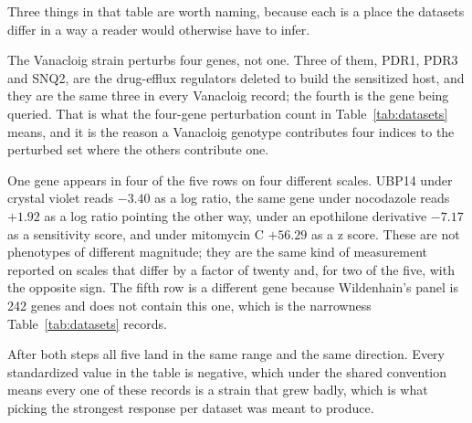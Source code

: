 \begin{table}[htbp]
\centering
\footnotesize
\caption{One real served record from each dataset, carried through the two target
transformations. The strain column gives the queried gene with its common name, and for
Vanacloig also the three sensitized-host deletions every one of its genotypes carries.
$o_k$ is the orientation factor and $\tilde y$ the standardized target. The records were
chosen as the strongest response of a gene measured in all five, so the arithmetic is visible
rather than sitting at zero.}
\label{tab:worked}

\end{table}

Three things in that table are worth naming, because each is a place the datasets differ in a
way a reader would otherwise have to infer.

The Vanacloig strain perturbs four genes, not one. Three of them, PDR1, PDR3 and SNQ2, are
the drug-efflux regulators deleted to build the sensitized host, and they are the same three
in every Vanacloig record; the fourth is the gene being queried. That is what the four-gene
perturbation count in Table~\ref{tab:datasets} means, and it is the reason a Vanacloig
genotype contributes four indices to the perturbed set where the others contribute one.

One gene appears in four of the five rows on four different scales. UBP14 under crystal violet
reads $-3.40$ as a log ratio, the same gene under nocodazole reads $+1.92$ as a log ratio
pointing the other way, under an epothilone derivative $-7.17$ as a sensitivity score, and
under mitomycin C $+56.29$ as a z score. These are not phenotypes of different magnitude; they
are the same kind of measurement reported on scales that differ by a factor of twenty and, for
two of the five, with the opposite sign. The fifth row is a different gene because
Wildenhain's panel is 242 genes and does not contain this one, which is the narrowness
Table~\ref{tab:datasets} records.

After both steps all five land in the same range and the same direction. Every standardized
value in the table is negative, which under the shared convention means every one of these
records is a strain that grew badly, which is what picking the strongest response per dataset
was meant to produce.

